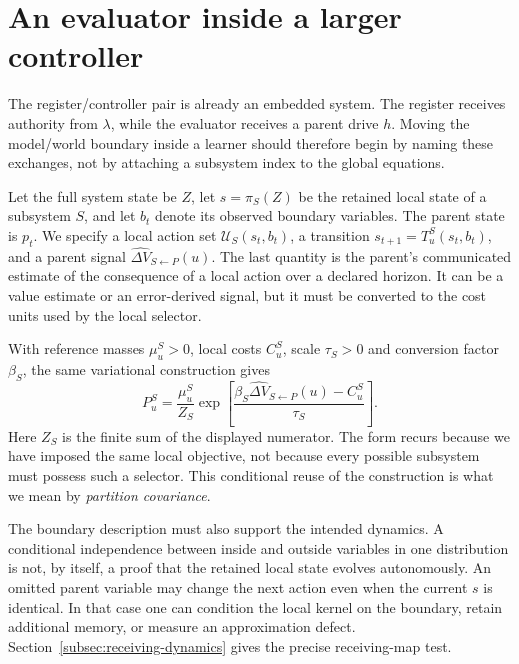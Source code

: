 \section{An evaluator inside a larger controller}
\label{sec:partition-covariance-reuse}

The register/controller pair is already an embedded system. The register receives authority from \(\lambda\), while the evaluator receives a parent drive \(h\). Moving the model/world boundary inside a learner should therefore begin by naming these exchanges, not by attaching a subsystem index to the global equations.

Let the full system state be \(Z\), let \(s=\pi_S(Z)\) be the retained local state of a subsystem \(S\), and let \(b_t\) denote its observed boundary variables. The parent state is \(p_t\). We specify a local action set \(\mathcal U_S(s_t,b_t)\), a transition
\(s_{t+1}=T^S_u(s_t,b_t)\), and a parent signal
\(\widehat{\Delta V}_{S\leftarrow P}(u)\).
The last quantity is the parent's communicated estimate of the consequence of a local action over a declared horizon. It can be a value estimate or an error-derived signal, but it must be converted to the cost units used by the local selector.

With reference masses \(\mu^S_u>0\), local costs \(C^S_u\), scale \(\tau_S>0\) and conversion factor \(\beta_S\), the same variational construction gives
\begin{equation}
 P^S_u=\frac{\mu^S_u}{Z_S}
 \exp\!\left[
 \frac{\beta_S\widehat{\Delta V}_{S\leftarrow P}(u)-C^S_u}
      {\tau_S}\right].
 \label{eq:yba-pcr-local-update-ensemble}
\end{equation}
Here \(Z_S\) is the finite sum of the displayed numerator. The form recurs because we have imposed the same local objective, not because every possible subsystem must possess such a selector. This conditional reuse of the construction is what we mean by \emph{partition covariance}.

The boundary description must also support the intended dynamics. A conditional independence between inside and outside variables in one distribution is not, by itself, a proof that the retained local state evolves autonomously. An omitted parent variable may change the next action even when the current \(s\) is identical. In that case one can condition the local kernel on the boundary, retain additional memory, or measure an approximation defect. Section~\ref{subsec:receiving-dynamics} gives the precise receiving-map test.

